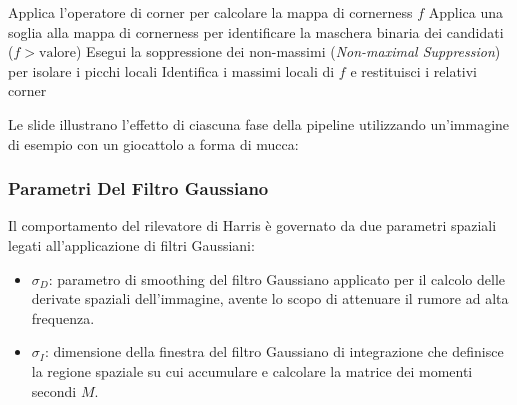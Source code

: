 ﻿\documentclass[11pt, a4paper]{article}
\begin{document}

\begin{algorithm}[H]
\caption{Rilevamento dei Corner di Harris}
\Inizializza\;
Applica l'operatore di corner per calcolare la mappa di cornerness $f$\;
Applica una soglia alla mappa di cornerness per identificare la maschera binaria dei candidati ($f > \text{valore}$)\;
Esegui la soppressione dei non-massimi (\emph{Non-maximal Suppression}) per isolare i picchi locali\;
Identifica i massimi locali di $f$ e restituisci i relativi corner\;
\end{algorithm}

Le slide illustrano l'effetto di ciascuna fase della pipeline utilizzando un'immagine di esempio con un giocattolo a forma di mucca:






\subsubsection{Parametri Del Filtro Gaussiano}
Il comportamento del rilevatore di Harris è governato da due parametri spaziali legati all'applicazione di filtri Gaussiani:
\begin{itemize}
    \item $\sigma_D$: parametro di smoothing del filtro Gaussiano applicato per il calcolo delle derivate spaziali dell'immagine, avente lo scopo di attenuare il rumore ad alta frequenza.
    \item $\sigma_I$: dimensione della finestra del filtro Gaussiano di integrazione che definisce la regione spaziale su cui accumulare e calcolare la matrice dei momenti secondi $M$.
\end{itemize}
\end{document}
